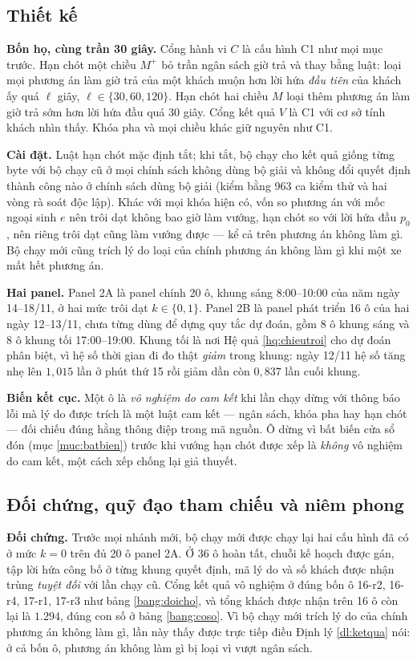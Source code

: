 \subsection{Thiết kế}

\textbf{Bốn họ, cùng trần 30 giây.} Cổng hành vi $C$ là cấu hình C1 như mọi mục trước. Hạn chót một
chiều $M^{+}$ bỏ trần ngân sách giờ trả và thay bằng luật: loại mọi phương án làm giờ trả của một
khách muộn hơn lời hứa \emph{đầu tiên} của khách ấy quá $\ell$ giây, $\ell \in \{30, 60, 120\}$.
Hạn chót hai chiều $M$ loại thêm phương án làm giờ trả sớm hơn lời hứa đầu quá 30 giây. Cổng kết quả
$V$ là C1 với cơ sở tính khách nhìn thấy. Khóa pha và mọi chiều khác giữ nguyên như C1.

\textbf{Cài đặt.} Luật hạn chót mặc định tắt; khi tắt, bộ chạy cho kết quả giống từng byte với bộ
chạy cũ ở mọi chính sách không dùng bộ giải và không đổi quyết định thành công nào ở chính sách dùng
bộ giải (kiểm bằng 963 ca kiểm thử và hai vòng rà soát độc lập). Khác với mọi khóa hiện có, vốn so
phương án với mốc ngoại sinh $e$ nên trôi dạt không bao giờ làm vướng, hạn chót so với lời hứa đầu
$p_0$, nên riêng trôi dạt cũng làm vướng được --- kể cả trên phương án không làm gì. Bộ chạy mới cũng
trích lý do loại của chính phương án không làm gì khi một xe mất hết phương án.

\textbf{Hai panel.} Panel 2A là panel chính 20 ô, khung sáng 8:00--10:00 của năm ngày 14--18/11, ở
hai mức trôi dạt $k \in \{0, 1\}$. Panel 2B là panel phát triển 16 ô của hai ngày 12--13/11, chưa
từng dùng để dựng quy tắc dự đoán, gồm 8 ô khung sáng và 8 ô khung tối 17:00--19:00. Khung tối là
nơi Hệ quả \ref{hq:chieutroi} cho dự đoán phân biệt, vì hệ số thời gian đi đo thật \emph{giảm}
trong khung: ngày 12/11 hệ số tăng nhẹ lên $1{,}015$ lần ở phút thứ 15 rồi giảm dần còn $0{,}837$ lần
cuối khung.

\textbf{Biến kết cục.} Một ô là \emph{vô nghiệm do cam kết} khi lần chạy dừng với thông báo lỗi mà
lý do được trích là một luật cam kết --- ngân sách, khóa pha hay hạn chót --- đối chiếu đúng hằng
thông điệp trong mã nguồn. Ô dừng vì bất biến cửa sổ đón (mục \ref{muc:batbien}) trước khi vướng
hạn chót được xếp là \emph{không} vô nghiệm do cam kết, một cách xếp chống lại giả thuyết.

\subsection{Đối chứng, quỹ đạo tham chiếu và niêm phong}

\textbf{Đối chứng.} Trước mọi nhánh mới, bộ chạy mới được chạy lại hai cấu hình đã có ở mức $k = 0$
trên đủ 20 ô panel 2A. Ở 36 ô hoàn tất, chuỗi kế hoạch được gán, tập lời hứa công bố ở từng khung
quyết định, mã lý do và số khách được nhận trùng \emph{tuyệt đối} với lần chạy cũ. Cổng kết quả vô
nghiệm ở đúng bốn ô 16-r2, 16-r4, 17-r1, 17-r3 như bảng \ref{bang:doicho}, và tổng khách được nhận
trên 16 ô còn lại là $1.294$, đúng con số ở bảng \ref{bang:coso}. Vì bộ chạy mới trích lý do của
chính phương án không làm gì, lần này thấy được trực tiếp điều Định lý \ref{dl:ketqua} nói: ở cả bốn
ô, phương án không làm gì bị loại vì vượt ngân sách.

